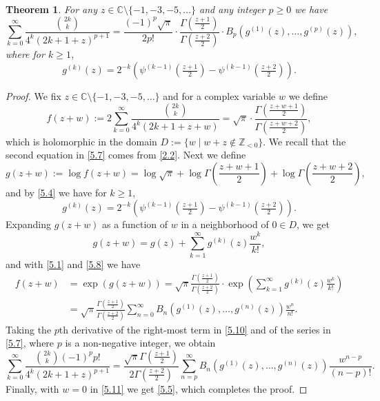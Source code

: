 \documentclass{amsart}
\newtheorem{theorem}{Theorem}[section]
\theoremstyle{definition}
\theoremstyle{remark}
\numberwithin{equation}{section}
\begin{document}
\begin{theorem}\label{thm:5.1}
For any $z\in{\mathbb C}\setminus\{-1,-3,-5,\ldots\}$ and any integer 
$p\geq 0$ we have
\begin{equation}\label{5.5}
\sum_{k=0}^\infty\frac{\binom{2k}{k}}{4^k(2k+1+z)^{p+1}}
=\frac{(-1)^p\sqrt{\pi}}{2p!}
\cdot\frac{\Gamma(\frac{z+1}{2})}{\Gamma(\frac{z+2}{2})}
\cdot B_{p}(g^{(1)}(z),\ldots,g^{(p)}(z)),
\end{equation}
where for $k\geq 1$,
\begin{equation}\label{5.6}
g^{(k)}(z)
= 2^{-k}\left(\psi^{(k-1)}(\tfrac{z+1}{2})-\psi^{(k-1)}(\tfrac{z+2}{2})\right).
\end{equation}
\end{theorem}

\begin{proof}
We fix $z\in{\mathbb C}\setminus\{-1,-3,-5,\ldots\}$ and for a complex variable
$w$ we define
\begin{equation}\label{5.7}
f(z+w):=2\sum_{k=0}^\infty\frac{\binom{2k}{k}}{4^k(2k+1+z+w)}
=\sqrt{\pi}\cdot\frac{\Gamma(\frac{z+w+1}{2})}{\Gamma(\frac{z+w+2}{2})},
\end{equation}
which is holomorphic in the domain $D:=\{w\mid w+z\not\in{\mathbb Z}_{<0}\}$.
We recall that the second equation in \eqref{5.7} comes from \eqref{2.2}.
Next we define
\begin{equation}\label{5.8}
g(z+w):=\log f(z+w)=\log\sqrt{\pi}+\log\Gamma(\frac{z+w+1}{2})
+\log\Gamma(\frac{z+w+2}{2}),
\end{equation}
and by \eqref{5.4} we have for $k\geq 1$,
\begin{equation}\label{5.9}
g^{(k)}(z)
=2^{-k}\left(\psi^{(k-1)}(\tfrac{z+1}{2})-\psi^{(k-1)}(\tfrac{z+2}{2})\right).
\end{equation}
Expanding $g(z+w)$ as a function of $w$ in a neighborhood of $0\in D$, we get 
\[
g(z+w) = g(z)+\sum_{k=1}^\infty g^{(k)}(z)\frac{w^k}{k!},
\]
and with \eqref{5.1} and \eqref{5.8} we have
\begin{align}
f(z+w)&=\exp(g(z+w))
=\sqrt{\pi}\frac{\Gamma(\frac{z+1}{2})}{\Gamma(\frac{z+2}{2})}
\cdot\exp\left(\sum_{k=1}^\infty g^{(k)}(z)\frac{w^k}{k!}\right)\label{5.10}\\
&=\sqrt{\pi}\frac{\Gamma(\frac{z+1}{2})}{\Gamma(\frac{z+2}{2})}
\sum_{n=0}^\infty B_n(g^{(1)}(z),\ldots,g^{(n)}(z))\frac{w^n}{n!}.\nonumber
\end{align}
Taking the $p$th derivative of the right-most term in \eqref{5.10} and of the
series in \eqref{5.7}, where $p$ is a non-negative integer, we obtain
\begin{equation}\label{5.11}
\sum_{k=0}^\infty\frac{\binom{2k}{k}(-1)^p p!}{4^k(2k+1+z)^{p+1}}
=\frac{\sqrt{\pi}\Gamma(\frac{z+1}{2})}{2\Gamma(\frac{z+2}{2})}
\sum_{n=p}^\infty B_n(g^{(1)}(z),\ldots,g^{(n)}(z))\frac{w^{n-p}}{(n-p)!}.
\end{equation}
Finally, with $w=0$ in \eqref{5.11} we get \eqref{5.5}, which completes the
proof.
\end{proof}
\end{document}
